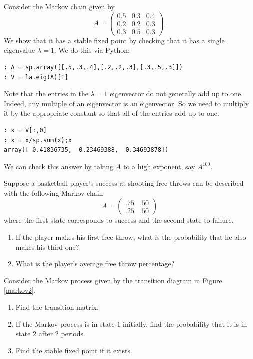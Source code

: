 Consider the Markov chain given by
\[
A = \begin{pmatrix}
0.5 & 0.3 & 0.4\\
0.2 & 0.2 & 0.3\\
0.3 & 0.5 & 0.3
\end{pmatrix}.
\]
We show that it has a stable fixed point by checking that it has a single eigenvalue $\lambda=1$.
We do this via Python:
\begin{lstlisting}
: A = sp.array([[.5,.3,.4],[.2,.2,.3],[.3,.5,.3]])
: V = la.eig(A)[1]
\end{lstlisting}
Note that the entries in the $\lambda=1$ eigenvector do not generally add up to one.
Indeed, any multiple of an eigenvector is an eigenvector.
So we need to multiply it by the appropriate constant so that all of the entries add up to one.
\begin{lstlisting}
: x = V[:,0]
: x = x/sp.sum(x);x
array([ 0.41836735,  0.23469388,  0.34693878])
\end{lstlisting}
We can check this answer by taking $A$ to a high exponent, say $A^{100}$.

\begin{problem}
Suppose a basketball player's success at shooting free throws can be described with the following Markov chain
\[
A = \begin{pmatrix}.75&.50\\.25&.50\end{pmatrix}
\]
where the first state corresponds to success and the second state to failure.
\begin{enumerate}
\item If the player makes his first free throw, what is the probability that he also makes his third one?
\item What is the player's average free throw percentage?
\end{enumerate}
\end{problem}

\begin{problem}
Consider the Markov process given by the transition diagram in Figure \ref{markov2}.
\begin{enumerate}
\item Find the transition matrix.
\item If the Markov process is in state 1 initially, find the probability that it is in state 2 after 2 periods.
\item Find the stable fixed point if it exists.
\end{enumerate}
\end{problem}


